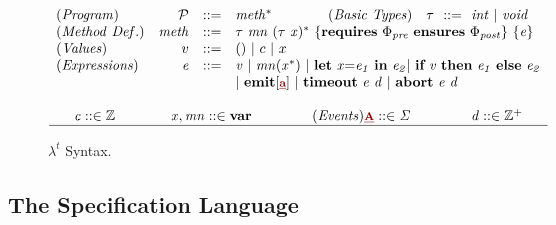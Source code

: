 \documentclass[acmsmall,review,anonymous]{acmart}\settopmatter{printfolios=true,printccs=false,printacmref=false}
\newcommand{\effect}{\textcolor{black}{\ensuremath{\mathrm{\Phi}}}}
\newcommand{\anyevent}[1]{{\textcolor{darkred}
{\underline{\textbf{\footnotesize #1}}}}}
\newcommand{\code}[1]{{\tt{\ensuremath{\m{#1}}}}}
\newcommand{\m}{\mathit}
\begin{document}
{{
 
\begin{figure}[!ht]
\renewcommand{\arraystretch}{1.2}
\centering
  $
  \begin{array}{lrcl}

    \m{(Program)} &  \code{\mathcal{P} }&\code{  ::= }&
    \code{%
   {meth^*}} 
\qquad   \qquad
    \m{(Basic\ Types)} \quad  \code{\tau} \code{\ \ ::= \ \ }
     \code{int\ 
     |\ void}
    \\
    

  \m{(Method\ Def.)} &  \code{meth}&\code{  ::= }&
  \code{\tau \ mn  \ {( \tau\ x)^*}\ \{\textbf{requires}\ \effect_{pre}\ \textbf{ensures}\  \effect_{post}\} \ \{ e \}}
  \\
  \code{(Values)} &  {v}&\code{  ::= }&
  ()\ |\ c \ | \  x 
  
 \\
  \m{(Expressions)} &  \code{e}&\code{  ::= }&
    \code{ v\ 
    |\ mn({x^*}) \ 
    |\ \textbf{let}\ x{=}e_1\ \textbf{in} \ e_2
    |\ \textbf{if}\ v\ \textbf{then}\ e_1\ \textbf{else}\ e_2 
 }\\ %
 &   & & \code{
  |\ \textbf{emit} [\anyevent{a}]\ 
  | \  \textbf{timeout}\ e \ d \ | \ \textbf{abort} \ e \ d 
  }  \\~\\

 
 
    \multicolumn{4}{c}{
      \code{c::\in \mathbb{Z}} \qquad\quad\ \ \
\code{x, mn  ::\in \textbf{var}}  
\qquad\quad\ \ \ \ \code{(Events)  \anyevent{A} ::\in \Sigma  } 
\qquad\quad\ \ \ \  \code{d::\in  \mathbb{Z}^{+}}  
    }\\  
    \hline
  \end{array}  
  $
 \caption{$\lambda^t$ Syntax.} 
 \label{work3_fig:lambda_t}

\end{figure}
}


\subsection{The Specification Language}
\label{work3_subsec:Specification_language}

}
\end{document}
